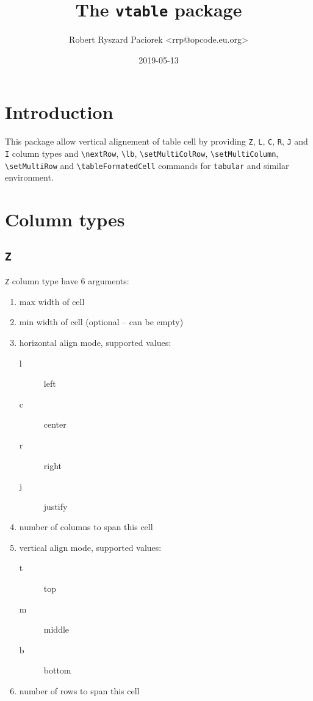 \documentclass[a4paper]{article}
\begin{document}
\title{The \texttt{vtable}  package}
\author{Robert Ryszard Paciorek <rrp@opcode.eu.org>}
\date{2019-05-13}
\maketitle

\section{Introduction}

This package allow vertical alignement of table cell
  by providing \texttt{Z}, \texttt{L}, \texttt{C}, \texttt{R}, \texttt{J} and \texttt{I} column types 
  and \Verb$\nextRow$, \Verb$\lb$, \Verb$\setMultiColRow$, \Verb$\setMultiColumn$, \Verb$\setMultiRow$ and \Verb$\tableFormatedCell$ commands
  for \texttt{tabular} and similar environment.

\section{Column types}

\subsection{\texttt{Z}}

\texttt{Z} column type have 6 arguments:
\begin{enumerate}
  \item max width of cell
  \item min width of cell (optional – can be empty)
  \item horizontal align mode, supported values:
    \begin{description}
      \item[l] left
      \item[c] center
      \item[r] right
      \item[j] justify
    \end{description}
  \item number of columns to span this cell
  \item vertical align mode, supported values:
    \begin{description}
      \item[t] top
      \item[m] middle
      \item[b] bottom
    \end{description}
  \item number of rows to span this cell
\end{enumerate}
\end{document}
